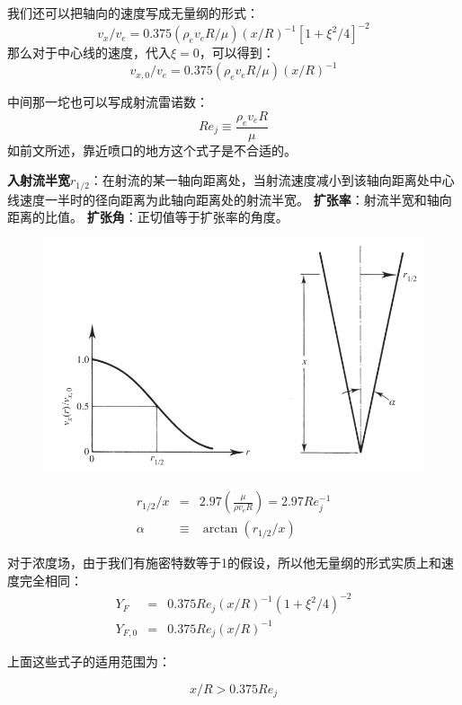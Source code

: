 \documentclass[10pt, landscape]{extarticle}
\numberwithin{equation}{section}
\begin{document}
\begin{multicols}{3}
我们还可以把轴向的速度写成无量纲的形式：
\begin{equation}
    v_x/v_e = 0.375(\rho_e v_e R/\mu)(x/R)^{-1}[1+\xi^2/4]^{-2}
\end{equation}
那么对于中心线的速度，代入\(\xi=0\)，可以得到：
\begin{equation}
    v_{x,0}/v_e = 0.375(\rho_e v_e R/\mu)(x/R)^{-1}
\end{equation}

中间那一坨也可以写成射流雷诺数：
\begin{equation}
    Re_j \equiv \frac{\rho_e v_e R}{\mu}
\end{equation}
如前文所述，靠近喷口的地方这个式子是不合适的。

\textbf{入射流半宽}\(r_{1/2}\)：在射流的某一轴向距离处，当射流速度减小到该轴向距离处中心线速度一半时的径向距离为此轴向距离处的射流半宽。
\textbf{扩张率}：射流半宽和轴向距离的比值。
\textbf{扩张角}：正切值等于扩张率的角度。
\begin{figure}[H]
    \centering
    \includegraphics[width=.3\textwidth]{img/spreading_laminar.png}
\end{figure}

\begin{eqnarray}
    r_{1/2}/x &=& 2.97\left(\frac{\mu}{\rho v_e R}\right)=2.97 Re_j^{-1}\\
    \alpha &\equiv& \arctan(r_{1/2}/x)
\end{eqnarray}

对于浓度场，由于我们有施密特数等于1的假设，所以他无量纲的形式实质上和速度完全相同：
\begin{eqnarray}
    Y_F &=& 0.375 Re_j(x/R)^{-1}(1+\xi^2/4)^{-2}\\
    Y_{F,0} &=& 0.375 Re_j(x/R)^{-1}
\end{eqnarray}

上面这些式子的适用范围为：

\begin{equation}
    x/R > 0.375 Re_j
\end{equation}

\end{multicols}
\end{document}
